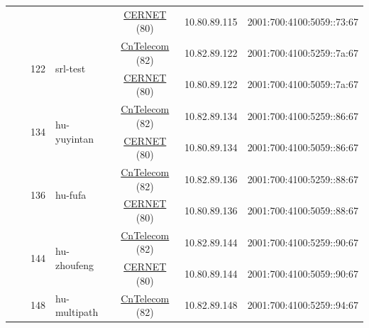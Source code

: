 \begin{small}
\begin{center}
\begin{longtable}{|c|c|c|c|c|c|c|c|}
  &  &  &  & \multicolumn{2}{|c|}{\tiny{\href{http://www.cernet.edu.cn}{CERNET} (80)}} & \tiny{10.80.89.115} & \tiny{2001:700:4100:5059::73:67} \\* \cline{3-3}\cline{4-4}\cline{5-5}\cline{6-6}\cline{7-7}\cline{8-8}
  &  & \multirow{2}{*}{\tiny{122}} & \multicolumn{1}{|l|}{\multirow{2}{*}{\tiny{srl-test}}} & \multicolumn{2}{|c|}{\tiny{\href{http://www.chinatelecom.com.cn}{CnTelecom} (82)}} & \tiny{10.82.89.122} & \tiny{2001:700:4100:5259::7a:67} \\* \cline{5-5}\cline{6-6}\cline{7-7}\cline{8-8}
  &  &  &  & \multicolumn{2}{|c|}{\tiny{\href{http://www.cernet.edu.cn}{CERNET} (80)}} & \tiny{10.80.89.122} & \tiny{2001:700:4100:5059::7a:67} \\* \cline{3-3}\cline{4-4}\cline{5-5}\cline{6-6}\cline{7-7}\cline{8-8}
  &  & \multirow{2}{*}{\tiny{134}} & \multicolumn{1}{|l|}{\multirow{2}{*}{\tiny{hu-yuyintan}}} & \multicolumn{2}{|c|}{\tiny{\href{http://www.chinatelecom.com.cn}{CnTelecom} (82)}} & \tiny{10.82.89.134} & \tiny{2001:700:4100:5259::86:67} \\* \cline{5-5}\cline{6-6}\cline{7-7}\cline{8-8}
  &  &  &  & \multicolumn{2}{|c|}{\tiny{\href{http://www.cernet.edu.cn}{CERNET} (80)}} & \tiny{10.80.89.134} & \tiny{2001:700:4100:5059::86:67} \\* \cline{3-3}\cline{4-4}\cline{5-5}\cline{6-6}\cline{7-7}\cline{8-8}
  &  & \multirow{2}{*}{\tiny{136}} & \multicolumn{1}{|l|}{\multirow{2}{*}{\tiny{hu-fufa}}} & \multicolumn{2}{|c|}{\tiny{\href{http://www.chinatelecom.com.cn}{CnTelecom} (82)}} & \tiny{10.82.89.136} & \tiny{2001:700:4100:5259::88:67} \\* \cline{5-5}\cline{6-6}\cline{7-7}\cline{8-8}
  &  &  &  & \multicolumn{2}{|c|}{\tiny{\href{http://www.cernet.edu.cn}{CERNET} (80)}} & \tiny{10.80.89.136} & \tiny{2001:700:4100:5059::88:67} \\* \cline{3-3}\cline{4-4}\cline{5-5}\cline{6-6}\cline{7-7}\cline{8-8}
  &  & \multirow{2}{*}{\tiny{144}} & \multicolumn{1}{|l|}{\multirow{2}{*}{\tiny{hu-zhoufeng}}} & \multicolumn{2}{|c|}{\tiny{\href{http://www.chinatelecom.com.cn}{CnTelecom} (82)}} & \tiny{10.82.89.144} & \tiny{2001:700:4100:5259::90:67} \\* \cline{5-5}\cline{6-6}\cline{7-7}\cline{8-8}
  &  &  &  & \multicolumn{2}{|c|}{\tiny{\href{http://www.cernet.edu.cn}{CERNET} (80)}} & \tiny{10.80.89.144} & \tiny{2001:700:4100:5059::90:67} \\* \cline{3-3}\cline{4-4}\cline{5-5}\cline{6-6}\cline{7-7}\cline{8-8}
  &  & \multirow{2}{*}{\tiny{148}} & \multicolumn{1}{|l|}{\multirow{2}{*}{\tiny{hu-multipath}}} & \multicolumn{2}{|c|}{\tiny{\href{http://www.chinatelecom.com.cn}{CnTelecom} (82)}} & \tiny{10.82.89.148} & \tiny{2001:700:4100:5259::94:67} \\* \cline{5-5}\cline{6-6}\cline{7-7}\cline{8-8}

\end{longtable}
\end{center}
\end{small}
